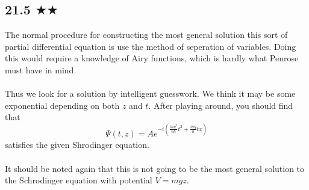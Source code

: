 \subsection{21.5 $\bigstar \bigstar$}
The normal procedure for constructing the most general solution this sort of partial differential equation is use the method of seperation of variables. Doing this would require a knowledge of Airy functions, which is hardly what Penrose must have in mind.\\ \\ Thus we look for a solution by intelligent guesswork. We think it may be some exponential depending on both $z$ and $t$. After playing around, you should find that
$$\Psi(t,z)=Ae^{-i(\frac{mg^2}{6\hbar}t^3+\frac{mg}{\hbar}tx)}$$
satisfies the given Shrodinger equation.\\ \\  It should be noted again that this is not going to be the most general solution to the Schrodinger equation with potential $V=mgz$.







